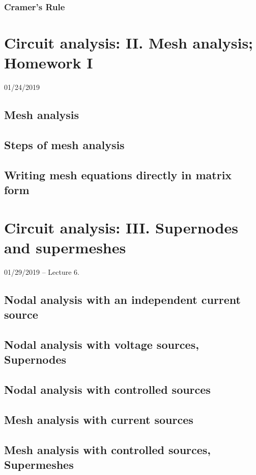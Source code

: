 \documentclass[11pt]{book}
\begin{document}
\subsection{Cramer's Rule}





\chapter{Circuit analysis: II. Mesh analysis; Homework I}
01/24/2019
\section{Mesh analysis}
\section{Steps of mesh analysis}
\section{Writing mesh equations directly in matrix form}



\chapter{Circuit analysis: III. Supernodes and supermeshes}
01/29/2019 – Lecture 6. 
\section{Nodal analysis with an independent current source}
\section{Nodal analysis with voltage sources, \textbf{Supernodes}}
\section{Nodal analysis with controlled sources}
\section{Mesh analysis with current sources}
\section{Mesh analysis with controlled sources, \textbf{Supermeshes}}
\end{document}
